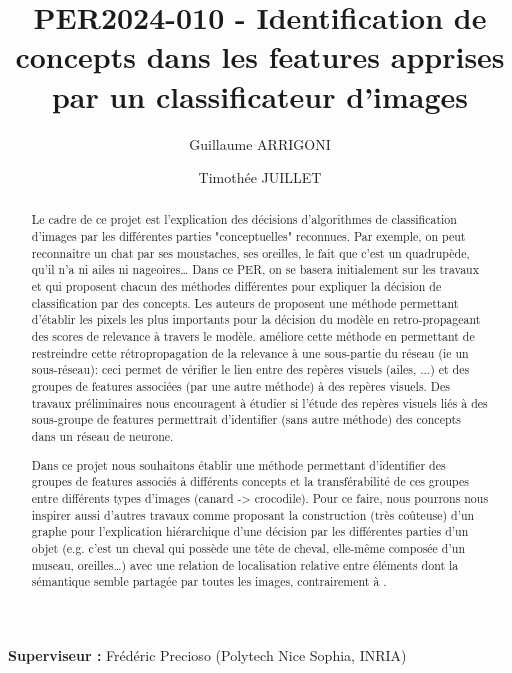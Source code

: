 \documentclass[runningheads]{llncs}
\title{PER2024-010 - Identification de concepts dans les features apprises par un classificateur d'images}
\author{Guillaume ARRIGONI\inst{1} \and Timothée JUILLET\inst{1}}
\institute{Polytech Nice Sophia - Université Côte d'Azur, France \\
\email{guillaume.arrigoni@etu.univ-cotedazur.fr,timothee.juillet@etu.univ-cotedazur.fr}}
\begin{document}
\maketitle
\pagestyle{plain}

\begin{abstract}
Le cadre de ce projet est l'explication des décisions d'algorithmes de classification d'images par les différentes parties "conceptuelles" reconnues. Par exemple, on peut reconnaitre un chat par ses moustaches, ses oreilles, le fait que c'est un quadrupède, qu'il n'a ni ailes ni nageoires… Dans ce PER, on se basera initialement sur les travaux \autocite{binder2016layerwiserelevancepropagationneural} et \autocite{Achtibat2023} qui proposent chacun des méthodes différentes pour expliquer la décision de classification par des concepts. Les auteurs de \autocite{binder2016layerwiserelevancepropagationneural} proposent une méthode permettant d'établir les pixels les plus importants pour la décision du modèle en retro-propageant des scores de relevance à travers le modèle. \autocite{Achtibat2023} améliore cette méthode en permettant de restreindre cette rétropropagation de la relevance à une sous-partie du réseau (ie un sous-réseau): ceci permet de vérifier le lien entre des repères visuels (ailes, ...)  et des groupes de features associées (par une autre méthode) à des repères visuels. Des travaux préliminaires nous encouragent à étudier si l'étude des repères visuels liés à des sous-groupe de features permettrait d'identifier (sans autre méthode) des concepts dans un réseau de neurone.\par
Dans ce projet nous souhaitons établir une méthode permettant d'identifier des groupes de features associés à différents concepts et la transférabilité de ces groupes entre différents types d'images (canard -> crocodile). Pour ce faire, nous pourrons nous inspirer aussi d'autres travaux comme \autocite{9086075} proposant la construction (très coûteuse) d'un graphe pour l'explication hiérarchique d'une décision par les différentes parties d'un objet (e.g. c'est un cheval qui possède une tête de cheval, elle-même composée d'un museau, oreilles…) avec une relation de localisation relative entre éléments dont la sémantique semble partagée par toutes les images, contrairement à \autocite{binder2016layerwiserelevancepropagationneural,Achtibat2023}.

\end{abstract}

\textbf{Superviseur :} Frédéric Precioso (Polytech Nice Sophia, INRIA)
\end{document}
